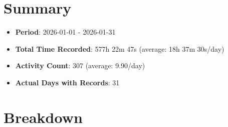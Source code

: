\documentclass[12pt]{extarticle}
\begin{document}
{\fontsize{18}{21.6}\selectfont\section*{Summary}}

\begin{itemize}[topsep=0pt, itemsep=-0.5ex]
    \item \textbf{Period}: 2026-01-01 - 2026-01-31
    \item \textbf{Total Time Recorded}: 577h 22m 47s (average: 18h 37m 30s/day)
    \item \textbf{Activity Count}: 307 (average: 9.90/day)
    \item \textbf{Actual Days with Records}: 31
\end{itemize}

{\fontsize{16}{19.2}\selectfont\section*{Breakdown}}
\end{document}
